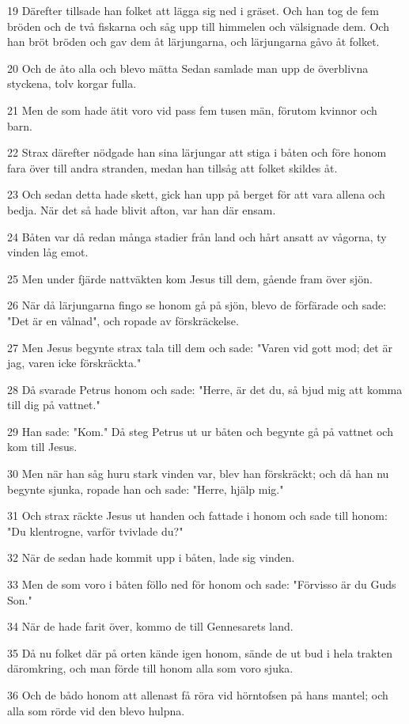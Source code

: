 \par 19 Därefter tillsade han folket att lägga sig ned i gräset. Och han tog de fem bröden och de två fiskarna och såg upp till himmelen och välsignade dem. Och han bröt bröden och gav dem åt lärjungarna, och lärjungarna gåvo åt folket.
\par 20 Och de åto alla och blevo mätta Sedan samlade man upp de överblivna styckena, tolv korgar fulla.
\par 21 Men de som hade ätit voro vid pass fem tusen män, förutom kvinnor och barn.
\par 22 Strax därefter nödgade han sina lärjungar att stiga i båten och före honom fara över till andra stranden, medan han tillsåg att folket skildes åt.
\par 23 Och sedan detta hade skett, gick han upp på berget för att vara allena och bedja. När det så hade blivit afton, var han där ensam.
\par 24 Båten var då redan många stadier från land och hårt ansatt av vågorna, ty vinden låg emot.
\par 25 Men under fjärde nattväkten kom Jesus till dem, gående fram över sjön.
\par 26 När då lärjungarna fingo se honom gå på sjön, blevo de förfärade och sade: "Det är en vålnad", och ropade av förskräckelse.
\par 27 Men Jesus begynte strax tala till dem och sade: "Varen vid gott mod; det är jag, varen icke förskräckta."
\par 28 Då svarade Petrus honom och sade: "Herre, är det du, så bjud mig att komma till dig på vattnet."
\par 29 Han sade: "Kom." Då steg Petrus ut ur båten och begynte gå på vattnet och kom till Jesus.
\par 30 Men när han såg huru stark vinden var, blev han förskräckt; och då han nu begynte sjunka, ropade han och sade: "Herre, hjälp mig."
\par 31 Och strax räckte Jesus ut handen och fattade i honom och sade till honom: "Du klentrogne, varför tvivlade du?"
\par 32 När de sedan hade kommit upp i båten, lade sig vinden.
\par 33 Men de som voro i båten föllo ned för honom och sade: "Förvisso är du Guds Son."
\par 34 När de hade farit över, kommo de till Gennesarets land.
\par 35 Då nu folket där på orten kände igen honom, sände de ut bud i hela trakten däromkring, och man förde till honom alla som voro sjuka.
\par 36 Och de bådo honom att allenast få röra vid hörntofsen på hans mantel; och alla som rörde vid den blevo hulpna.

